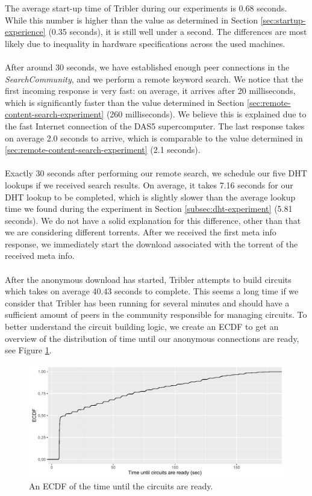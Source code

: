 The average start-up time of Tribler during our experiments is 0.68 seconds. While this number is higher than the value as determined in Section \ref{sec:startup-experience} (0.35 seconds), it is still well under a second. The differences are most likely due to inequality in hardware specifications across the used machines.\\\\
After around 30 seconds, we have established enough peer connections in the \emph{SearchCommunity}, and we perform a remote keyword search. We notice that the first incoming response is very fast: on average, it arrives after 20 milliseconds, which is significantly faster than the value determined in Section \ref{sec:remote-content-search-experiment} (260 milliseconds). We believe this is explained due to the fast Internet connection of the DAS5 supercomputer. The last response takes on average 2.0 seconds to arrive, which is comparable to the value determined in \ref{sec:remote-content-search-experiment} (2.1 seconds).\\\\
Exactly 30 seconds after performing our remote search, we schedule our five DHT lookups if we received search results. On average, it takes 7.16 seconds for our DHT lookup to be completed, which is slightly slower than the average lookup time we found during the experiment in Section \ref{subsec:dht-experiment} (5.81 seconds). We do not have a solid explanation for this difference, other than that we are considering different torrents. After we received the first meta info response, we immediately start the download associated with the torrent of the received meta info.\\\\
After the anonymous download has started, Tribler attempts to build circuits which takes on average 40.43 seconds to complete. This seems a long time if we consider that Tribler has been running for several minutes and should have a sufficient amount of peers in the community responsible for managing circuits. To better understand the circuit building logic, we create an ECDF to get an overview of the distribution of time until our anonymous connections are ready, see Figure \ref{fig:big-experiment-circuits}.\\

\begin{figure}[!h]
	\centering
	\includegraphics[width=1.0\columnwidth]{images/big_experiment/circuits_ecdf}
	\caption{An ECDF of the time until the circuits are ready.}
	\label{fig:big-experiment-circuits}
\end{figure}


